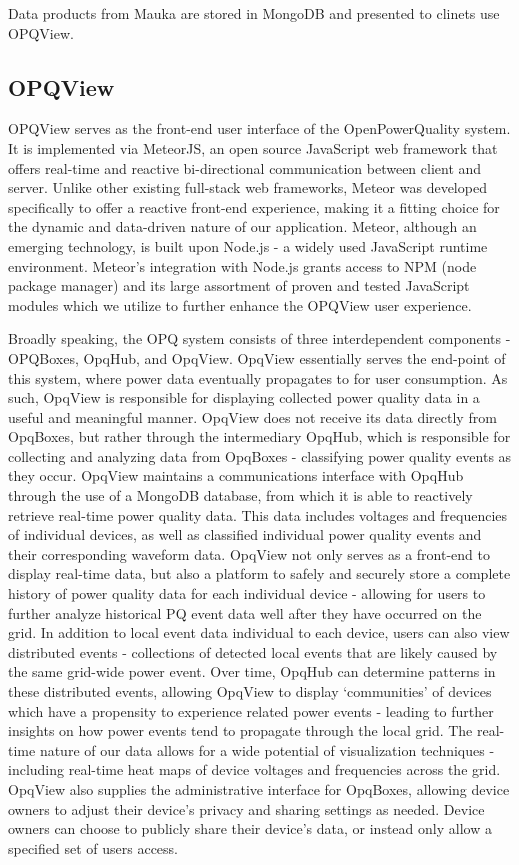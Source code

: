 \documentclass[conference]{IEEEtran}
\begin{document}
Data products from Mauka are stored in MongoDB and presented to clinets use OPQView.

\subsection{OPQView}
OPQView serves as the front-end user interface of the OpenPowerQuality system. It is implemented via MeteorJS, an open source JavaScript web framework that offers real-time and reactive bi-directional communication between client and server. Unlike other existing full-stack web frameworks, Meteor was developed specifically to offer a reactive front-end experience, making it a fitting choice for the dynamic and data-driven nature of our application. Meteor, although an emerging technology, is built upon Node.js - a widely used JavaScript runtime environment. Meteor’s integration with Node.js grants access to NPM (node package manager) and its large assortment of proven and tested JavaScript modules which we utilize to further enhance the OPQView user experience.

Broadly speaking, the OPQ system consists of three interdependent components - OPQBoxes, OpqHub, and OpqView. OpqView essentially serves the end-point of this system, where power data eventually propagates to for user consumption. As such, OpqView is responsible for displaying collected power quality data in a useful and meaningful manner. OpqView does not receive its data directly from OpqBoxes, but rather through the intermediary OpqHub, which is responsible for collecting and analyzing data from OpqBoxes - classifying power quality events as they occur. OpqView maintains a communications interface with OpqHub through the use of a MongoDB database, from which it is able to reactively retrieve real-time power quality data. This data includes voltages and frequencies of individual devices, as well as classified individual power quality events and their corresponding waveform data. OpqView not only serves as a front-end to display real-time data, but also a platform to safely and securely store a complete history of power quality data for each individual device - allowing for users to further analyze historical PQ event data well after they have occurred on the grid. In addition to local event data individual to each device, users can also view distributed events - collections of detected local events that are likely caused by the same grid-wide power event. Over time, OpqHub can determine patterns in these distributed events, allowing OpqView to display ‘communities’ of devices which have a propensity to experience related power events - leading to further insights on how power events tend to propagate through the local grid. The real-time nature of our data allows for a wide potential of visualization techniques - including real-time heat maps of device voltages and frequencies across the grid. OpqView also supplies the administrative interface for OpqBoxes, allowing device owners to adjust their device’s privacy and sharing settings as needed. Device owners can choose to publicly share their device’s data, or instead only allow a specified set of users access.
\end{document}
